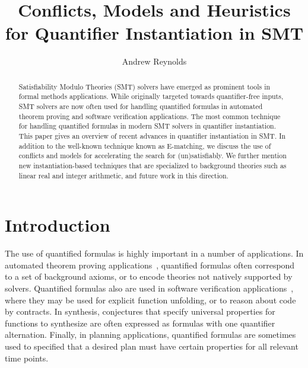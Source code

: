 \documentclass{easychair}
\begin{document}
\title{Conflicts, Models and Heuristics for Quantifier Instantiation in SMT}

\author {Andrew Reynolds}


\maketitle


\begin{abstract}
Satisfiability Modulo Theories (SMT) solvers have
emerged as prominent tools in formal methods applications.
While originally targeted towards quantifier-free inputs,
SMT solvers are now often used for handling quantified formulas in automated
theorem proving and software verification applications.
The most common technique for handling quantified formulas in modern SMT solvers
in quantifier instantiation.
This paper gives an overview of recent advances in quantifier instantiation in SMT.
In addition to the well-known technique known as E-matching,
we discuss the use of conflicts and models for 
accelerating the search for (un)satisfiably.
We further mention new instantiation-based techniques
that are specialized to background theories such as linear real and integer arithmetic,
and future work in this direction.
\end{abstract}

\section{Introduction}

The use of quantified formulas is highly important in a number of applications.
In automated theorem proving applications~\cite{blanchette2013extending,bobot2011why3},
quantified formulas often correspond to a set of background axioms,
or to encode theories not natively supported by solvers.
Quantified formulas also are used in software verification applications~\cite{DBLP:conf/icse/Leino04,DBLP:conf/itp/ChapmanS14},
where they may be used for explicit function unfolding, or to reason about code by contracts.
In synthesis, conjectures that specify universal properties for functions to synthesize are often expressed as formulas
with one quantifier alternation.
Finally, in planning applications, quantified formulas are sometimes used to specified
that a desired plan must have certain properties for all relevant time points.
\end{document}
